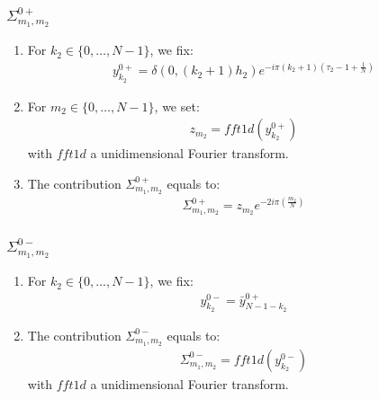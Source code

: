 \subsubsection{\texorpdfstring{$\Sigma_{m_1,m_2}^{0+}$}{sigma0+}}
\begin{enumerate}
\item For $k_2\in\{0,\hdots,N-1\}$, we fix:
\begin{align*}
y^{0+}_{k_2}= \delta(0,(k_2+1)h_2)e^{-i\pi (k_2+1)\left(\tau_2-1+\frac{1}{N}\right)}
\end{align*}
\item For $m_2\in\{0,\hdots,N-1\}$, we set:
\begin{align*}
  z_{m_2}=fft1d(y^{0+}_{k_2})
\end{align*}
with $fft1d$ a unidimensional Fourier transform.
\item The contribution $\Sigma_{m_1,m_2}^{0+}$ equals to:
\begin{align*}
  \Sigma_{m_1,m_2}^{0+}=z_{m_2}e^{-2i\pi\left(\frac{m_2}{N}\right)}
\end{align*}
\end{enumerate}

\subsubsection{\texorpdfstring{$\Sigma_{m_1,m_2}^{0-}$}{sigma0-}}
\begin{enumerate}
\item For $k_2\in\{0,\hdots,N-1\}$, we fix:
\begin{align*}
y^{0-}_{k_2}= \bar{y}^{0+}_{N-1-k_2}
\end{align*}
\item The contribution $\Sigma_{m_1,m_2}^{0-}$ equals to:
\begin{align*}
  \Sigma_{m_1,m_2}^{0-}=fft1d(y^{0-}_{k_2})
\end{align*}
with $fft1d$ a unidimensional Fourier transform.
\end{enumerate}

